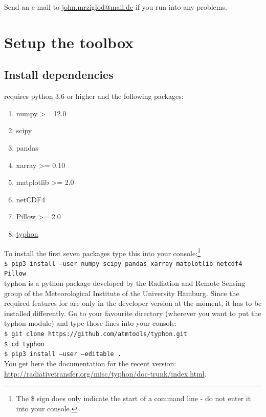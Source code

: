\documentclass[11pt,a4paper]{article}
\begin{document}
Send an e-mail to \href{mailto:john.mrziglod@mail.de}{john.mrziglod@mail.de} if you run into any problems.

\section{Setup the \cloud toolbox}
\label{sec:setup}
\subsection{Install dependencies}
\cloud requires python 3.6 or higher and the following packages:
\begin{enumerate}
	\item numpy \textgreater= 12.0
	\item scipy
	\item pandas
	\item xarray \textgreater= 0.10
	\item matplotlib \textgreater= 2.0
	\item netCDF4
	\item \href{http://pillow.readthedocs.io/en/4.3.x/}{Pillow} \textgreater= 2.0
	\item\href{https://github.com/atmtools/typhon}{typhon}
\end{enumerate}

To install the first seven packages type this into your console:\footnote{The \$ sign does only indicate the start of a command line - do not enter it into your console.}\\
\texttt{\$ pip3 install --user numpy scipy pandas xarray matplotlib netcdf4 Pillow}\\

typhon is a python package developed by the Radiation and Remote Sensing group of the Meteorological Institute of the University Hamburg. Since the required features for \cloud are only in the developer version at the moment, it has to be installed differently. Go to your favourite directory (wherever you want to put the typhon module) and type those lines into your console:\\
\texttt{\$ git clone https://github.com/atmtools/typhon.git}\\
\texttt{\$ cd typhon}\\
\texttt{\$ pip3 install --user --editable .}\\

You get here the documentation for the recent version: \url{http://radiativetransfer.org/misc/typhon/doc-trunk/index.html}.
\end{document}

